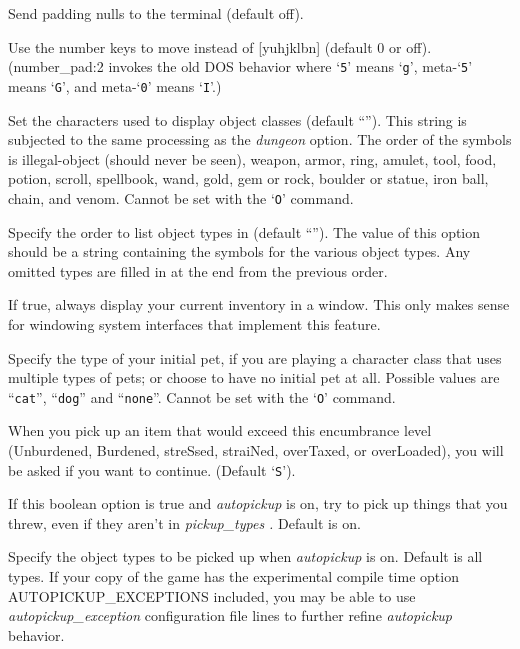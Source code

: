\item[\ib{null}]
Send padding nulls to the terminal (default off).

\item[\ib{number\_pad}]
Use the number keys to move instead of [yuhjklbn] (default 0 or off).
(number\_pad:2 invokes the old DOS behavior where `{\tt 5}' means `{\tt g}', meta-`{\tt 5}'
means `{\tt G}',  and meta-`{\tt 0}' means `{\tt I}'.)

\item[\ib{objects}]
Set the characters used to display object classes
(default ``\Symbol{])[="(\%!?+/\$*`0\_.}'').
This string is subjected to the same processing as the
{\it dungeon\/} 
option.
The order of the symbols is
illegal-object (should never be seen), weapon, armor, ring, amulet, tool,
food, potion, scroll, spellbook, wand, gold, gem or rock, boulder or statue,
iron ball, chain, and venom.
Cannot be set with the `{\tt O}' command.

\item[\ib{packorder}]
Specify the order to list object types in (default ``\Symbol{")[\%?+!=/(*`0\_}'').
The value of this option should be a string containing the
symbols for the various object types.  Any omitted types are filled in
at the end from the previous order.

\item[\ib{perm\_invent}]
If true, always display your current inventory in a window.  This only
makes sense for windowing system interfaces that implement this feature.

\item[\ib{pettype}]
Specify the type of your initial pet, if you are playing a character class
that uses multiple types of pets; or choose to have no initial pet at all.
Possible values are ``{\tt cat}'', ``{\tt dog}'' and ``{\tt none}''.
Cannot be set with the `{\tt O}' command.

\item[\ib{pickup\_burden}]
When you pick up an item that would exceed this encumbrance
level (Unburdened, Burdened, streSsed, straiNed, overTaxed,
or overLoaded), you will be asked if you want to continue.
(Default `{\tt S}').

\item[\ib{pickup\_thrown}]
If this boolean option is true and
{\it autopickup\/} 
is on, try to pick up things that you threw, even if they aren't in
{\it pickup_types .\/} 
Default is on.

\item[\ib{pickup\_types}]
Specify the object types to be picked up when
{\it autopickup\/} 
is on.  Default is all types.  If your copy of the game has the experimental
compile time option AUTOPICKUP\_EXCEPTIONS included, you may be able to use 
{\it autopickup_exception\/} 
configuration file lines to further refine
{\it autopickup\/} 
behavior.

